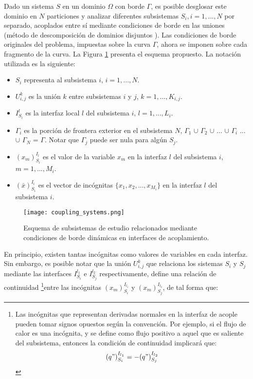 Dado un sistema $S$ en un dominio $\Omega$ con borde $\Gamma$, es posible desglosar este dominio en $N$ particiones 
y analizar diferentes subsistemas $S_i,i=1,...,N$ por separado, acoplados entre sí mediante condiciones de borde en las uniones
(método de descomposición de dominios disjuntos \cite{ddmethod}).
Las condiciones de borde originales del problema, impuestas sobre la curva $\Gamma$,
ahora se imponen sobre cada fragmento de la curva.
La Figura \ref{esquema-acoplamiento} presenta el esquema propuesto.
La notación utilizada es la siguiente:
\begin{itemize}
\item $S_i$ representa al subsistema $i$, $i=1,...,N$.
\item $U_{i,j}^k$ es la unión $k$ entre subsistemas $i$ y $j$, $k=1,...,K_{i,j}$.
\item $I_{S_i}^{l}$ es la interfaz local $l$ del subsistema $i$, $l=1,...,L_i$.
\item $\Gamma_i$ es la porción de frontera exterior en el subsistema $N$,
 $\Gamma_1$ $\cup$ $\Gamma_2$ $\cup$ ... $\cup$ $\Gamma_i$ ...  $\cup$ $\Gamma_N$ = $\Gamma$.
 Notar que $\Gamma_j$ puede ser nula para algún $S_j$.
\item ${(x_m)_{S_i}^{I_l}}$ es el valor de la variable $x_m$ en la interfaz ${l}$ del subsistema ${i}$, $m=1,...,M_i$.
\item ${(\bar{x})_{S_i}^{I_l}}$ es el vector de incógnitas $\{x_1,x_2,...,x_{M_i}\}$ en la interfaz ${l}$ del subsistema ${i}$.
\end{itemize}

\begin{figure}[ht]
\centering{}\texttt{[image: coupling\_systems.png]}
\caption[Esquema de descomposición en dominios disjuntos]{Esquema de subsistemas de estudio relacionados mediante condiciones de borde dinámicas en interfaces de acoplamiento.} 
\label{esquema-acoplamiento} 
\end{figure}

En principio, existen tantas incógnitas como valores de variables en cada interfaz.
Sin embargo, es posible notar que la unión $U_{i,j}^k$ que relaciona los sistemas $S_{i}$ y $S_{j}$ 
mediante las interfaces $I_{S_{i}}^{l_1}$ e $I_{S_{j}}^{l_2}$ respectivamente, 
define una relación de continuidad
\footnote{
Las incógnitas que representan derivadas normales en la interfaz de acople pueden tomar signos opuestos según la convención.
Por ejemplo, si el flujo de calor es una incógnita, 
y se define como flujo positivo a aquel que es saliente del subsistema, 
entonces la condición de continuidad implicará que:
\begin{equation*}
{(q")_{S_i}^{I_{l_1}}}=-{(q")_{S_j}^{I_{l_2}}}
\label{continuidad-q}
\end{equation*}
}entre las incógnitas ${(x_m)_{S_i}^{I_{l_1}}}$ y ${(x_m)_{S_j}^{I_{l_2}}}$, de tal forma que:

